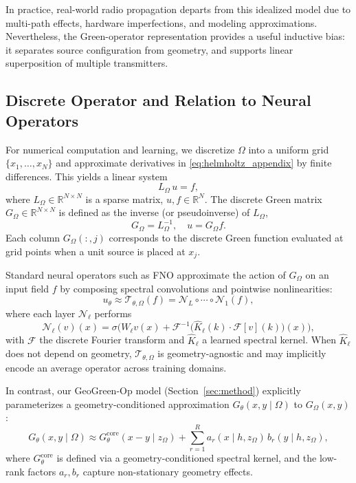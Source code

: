 \documentclass{article}
\begin{document}
In practice, real-world radio propagation departs from this idealized
model due to multi-path effects, hardware imperfections, and modeling
approximations. Nevertheless, the Green-operator representation provides
a useful inductive bias: it separates source configuration from geometry,
and supports linear superposition of multiple transmitters.

\subsection{Discrete Operator and Relation to Neural Operators}

For numerical computation and learning,
we discretize $\Omega$ into a uniform grid
$\{x_1,\dots, x_N\}$ and approximate derivatives in
\eqref{eq:helmholtz_appendix} by finite differences.
This yields a linear system
\begin{equation}
L_\Omega\, u = f,
\end{equation}
where $L_\Omega \in \mathbb{R}^{N \times N}$ is a sparse matrix,
$u, f \in \mathbb{R}^N$.
The discrete Green matrix $G_\Omega \in \mathbb{R}^{N \times N}$
is defined as the inverse (or pseudoinverse) of $L_\Omega$,
\begin{equation}
G_\Omega = L_\Omega^{-1},\quad
u = G_\Omega f.
\end{equation}
Each column $G_\Omega(:, j)$ corresponds to the discrete Green function
evaluated at grid points when a unit source is placed at $x_j$.

Standard neural operators such as FNO
approximate the action of $G_\Omega$ on an input field $f$ by
composing spectral convolutions and pointwise nonlinearities:
\begin{equation}
u_\theta
\approx \mathcal{T}_{\theta,\Omega}(f)
= \mathcal{N}_L \circ \cdots \circ \mathcal{N}_1(f),
\end{equation}
where each layer $\mathcal{N}_\ell$ performs
\begin{equation}
\mathcal{N}_\ell(v)(x)
= \sigma\Big(
  W_\ell v(x) +
  \mathcal{F}^{-1}\big(
    \hat{K}_\ell(k) \cdot \mathcal{F}[v](k)
  \big)(x)
\Big),
\end{equation}
with $\mathcal{F}$ the discrete Fourier transform
and $\hat{K}_\ell$ a learned spectral kernel.
When $\hat{K}_\ell$ does not depend on geometry,
$\mathcal{T}_{\theta,\Omega}$ is geometry-agnostic and may implicitly
encode an average operator across training domains.

In contrast, our GeoGreen-Op model (Section~\ref{sec:method})
explicitly parameterizes a geometry-conditioned approximation
$G_\theta(x, y \mid \Omega)$ to $G_\Omega(x, y)$:
\begin{equation}
G_\theta(x, y \mid \Omega)
\approx G^{\text{core}}_\theta(x-y \mid z_\Omega)
+ \sum_{r=1}^R a_r(x \mid h, z_\Omega)\, b_r(y \mid h, z_\Omega),
\end{equation}
where $G^{\text{core}}_\theta$ is defined via a geometry-conditioned
spectral kernel, and the low-rank factors $a_r, b_r$ capture
non-stationary geometry effects.
\end{document}
